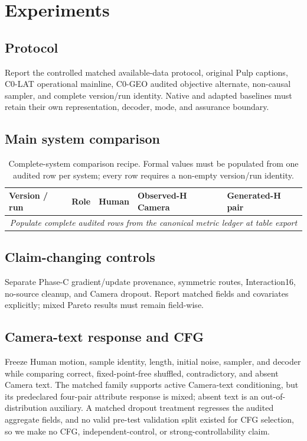 \section{Experiments}

\subsection{Protocol}

Report the controlled matched available-data protocol, original Pulp captions, C0-LAT
operational mainline, C0-GEO audited objective alternate, non-causal sampler, and complete
version/run identity. Native and adapted baselines must retain their own representation,
decoder, mode, and assurance boundary.

\subsection{Main system comparison}

\begin{table}[t]
  \centering
  \caption{Complete-system comparison recipe. Formal values must be populated from one audited
  row per system; every row requires a non-empty version/run identity.}
  \label{tab:main}
  \small
  \begin{tabular}{lllll}
    \toprule
    Version / run & Role & Human & Observed-H Camera & Generated-H pair \\
    \midrule
    \multicolumn{5}{c}{\textit{Populate complete audited rows from the canonical metric ledger at table export}} \\
    \bottomrule
  \end{tabular}
\end{table}

\subsection{Claim-changing controls}

Separate Phase-C gradient/update provenance, symmetric routes, Interaction16, no-source cleanup,
and Camera dropout. Report matched fields and covariates explicitly; mixed Pareto results must
remain field-wise.

\subsection{Camera-text response and CFG}

Freeze Human motion, sample identity, length, initial noise, sampler, and decoder while comparing
correct, fixed-point-free shuffled, contradictory, and absent Camera text. The matched family
supports active Camera-text conditioning, but its predeclared four-pair attribute response is
mixed; absent text is an out-of-distribution auxiliary. A matched dropout treatment regresses the
audited aggregate fields, and no valid pre-test validation split existed for CFG selection, so we
make no CFG, independent-control, or strong-controllability claim.

